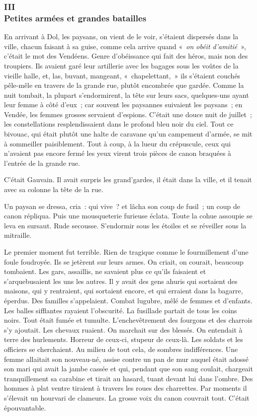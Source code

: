 \documentclass[french,twoside]{book} %
\begin{document}
 \subsubsection[{III. Petites armées et grandes batailles}]{III \\
Petites armées et grandes batailles}
\label{p3l2c3}
\noindent En arrivant à Dol, les paysans, on vient de le voir, s’étaient dispersés dans la ville, chacun faisant à sa guise, comme cela arrive quand « \emph{on obéit d’amitié} », c’était le mot des Vendéens. Genre d’obéissance qui fait des héros, mais non des troupiers. Ils avaient garé leur artillerie avec les bagages sous les voûtes de la vieille halle, et, las, buvant, mangeant, « chapelettant, » ils s’étaient couchés pêle-mêle en travers de la grande rue, plutôt encombrée que gardée. Comme la nuit tombait, la plupart s’endormirent, la tête sur leurs sacs, quelques-uns ayant leur femme à côté d’eux ; car souvent les paysannes suivaient les paysans ; en Vendée, les femmes grosses servaient d’espions. C’était une douce nuit de juillet ; les constellations resplendissaient dans le profond bleu noir du ciel. Tout ce bivouac, qui était plutôt une halte de caravane qu’un campement d’armée, se mit à sommeiller paisiblement. Tout à coup, à la lueur du crépuscule, ceux qui n’avaient pas encore fermé les yeux virent trois pièces de canon braquées à l’entrée de la grande rue.\par
C’était Gauvain. Il avait surpris les grand’gardes,  il était dans la ville, et il tenait avec sa colonne la tête de la rue.\par
Un paysan se dressa, cria : qui vive ? et lâcha son coup de fusil ; un coup de canon répliqua. Puis une mousqueterie furieuse éclata. Toute la cohue assoupie se leva en sursaut. Rude secousse. S’endormir sous les étoiles et se réveiller sous la mitraille.\par
Le premier moment fut terrible. Rien de tragique comme le fourmillement d’une foule foudroyée. Ils se jetèrent sur leurs armes. On criait, on courait, beaucoup tombaient. Les gars, assaillis, ne savaient plus ce qu’ils faisaient et s’arquebusaient les uns les autres. Il y avait des gens ahuris qui sortaient des maisons, qui y rentraient, qui sortaient encore, et qui erraient dans la bagarre, éperdus. Des familles s’appelaient. Combat lugubre, mêlé de femmes et d’enfants. Les balles sifflantes rayaient l’obscurité. La fusillade partait de tous les coins noirs. Tout était fumée et tumulte. L’enchevêtrement des fourgons et des charrois s’y ajoutait. Les chevaux ruaient. On marchait sur des blessés. On entendait à terre des hurlements. Horreur de ceux-ci, stupeur de ceux-là. Les soldats et les officiers se cherchaient. Au milieu de tout cela, de sombres indifférences. Une femme allaitait son nouveau-né, assise contre un pan de mur auquel était adossé son mari qui avait la jambe cassée et qui, pendant que son sang coulait, chargeait tranquillement sa carabine et tirait au hasard, tuant devant lui dans l’ombre. Des hommes à plat ventre tiraient à travers les roues des charrettes. Par moments  il s’élevait un hourvari de clameurs. La grosse voix du canon couvrait tout. C’était épouvantable.\par
\end{document}
